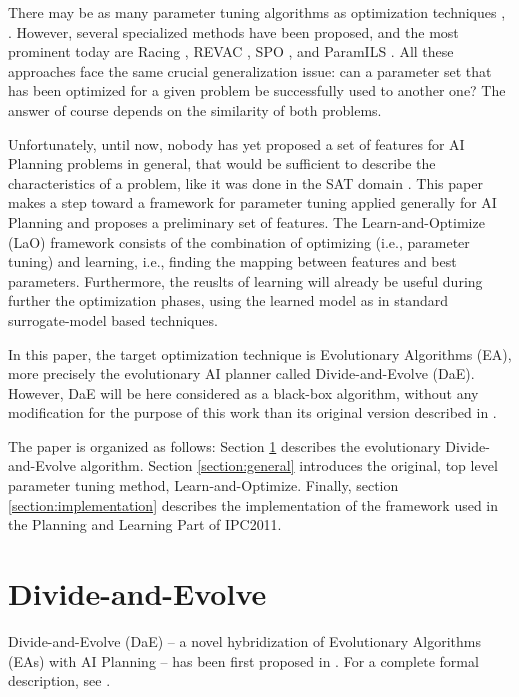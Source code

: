 \documentclass{article}
\begin{document}
There may be as many parameter tuning algorithms as optimization techniques \cite{Eiben2007}, \cite{Montero:2010}. However, several specialized methods have been proposed, and the most prominent today are Racing \cite{birattari2002}, REVAC \cite{Nannen07}, SPO \cite{SPO:CEC05}, and ParamILS \cite{ParamILS-JAIR}. All these approaches face the same crucial generalization issue: can a parameter set that has been optimized for a given problem be successfully used to another one? The answer of course depends on the similarity of both problems. 

Unfortunately, until now, nobody has yet proposed a set of features for AI Planning problems in general, that would be sufficient to describe the characteristics of a problem, like it was done in the SAT domain \cite{Hutter06}. This paper makes a step toward a framework for parameter tuning applied generally for AI Planning and proposes a preliminary set of features. The Learn-and-Optimize (LaO) framework consists of the combination of optimizing (i.e., parameter tuning) and learning, i.e., finding the mapping between features and best parameters. Furthermore, the reuslts of learning will already be useful during further the optimization phases, using the learned model as in standard surrogate-model based techniques.

In this paper, the target optimization technique is Evolutionary Algorithms (EA), more precisely the evolutionary AI planner called Divide-and-Evolve (DaE). However, DaE will be here considered as a black-box algorithm, without any modification for the purpose of this work than its original version described in \cite{BibEvoCop:2010}. 

The paper is organized as follows: Section \ref{section:dae} describes the evolutionary  Divide-and-Evolve algorithm. Section \ref{section:general} introduces the original, top level parameter tuning method, Learn-and-Optimize. Finally, section \ref{section:implementation} describes the implementation of the framework used in the Planning and Learning Part of IPC2011.

\section{Divide-and-Evolve}
\label{section:dae}

Divide-and-Evolve (DaE) -- a novel hybridization of Evolutionary Algorithms (EAs) with AI Planning -- has been first proposed in \cite{DAE:EvoCOP06}. For a complete formal description, see \cite{Bibai:ICAPS2010}. 
\end{document}
